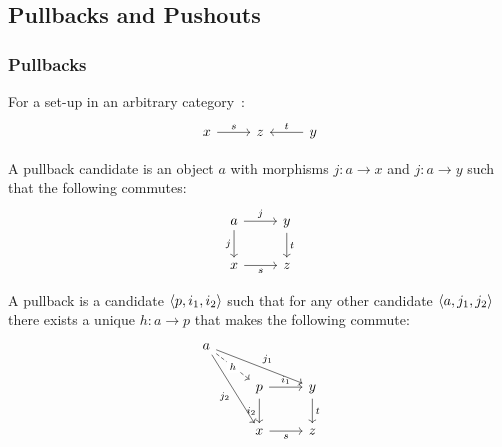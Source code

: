 \subsection{Pullbacks and Pushouts}

\subsubsection*{Pullbacks}

\begin{definition}
  For a set-up in an arbitrary
  category~\parencite{leinster:basic_category_theory}:
  \[\begin{tikzcd}[ampersand replacement=\&]
    x \& z \& y
    \arrow["t"', from=1-3, to=1-2]
    \arrow["s", from=1-1, to=1-2]
  \end{tikzcd}\]

  A pullback candidate is an object $a$ with morphisms $j:a\to x$ and
  $j:a\to y$ such that the following commutes:
  \[\begin{tikzcd}[ampersand replacement=\&]
    a \& y \\
    x \& z
    \arrow["t", from=1-2, to=2-2]
    \arrow["s"', from=2-1, to=2-2]
    \arrow["j"', from=1-1, to=2-1]
    \arrow["j", from=1-1, to=1-2]
  \end{tikzcd}\]

  A pullback is a candidate $\langle p, i_1, i_2\rangle$ such that for any other candidate
  $\langle a, j_1, j_2\rangle$ there exists a unique $h:a\to p$ that makes the following
  commute:
  \[\begin{tikzcd}[ampersand replacement=\&]
    a \\
    \& p \& y \\
    \& x \& z
    \arrow["{i_2}"', from=2-2, to=3-2]
    \arrow["{i_1}", from=2-2, to=2-3]
    \arrow["t", from=2-3, to=3-3]
    \arrow["s"', from=3-2, to=3-3]
    \arrow["{j_2}"', from=1-1, to=3-2]
    \arrow["{j_1}", from=1-1, to=2-3]
    \arrow["h"{description}, dashed, from=1-1, to=2-2]
  \end{tikzcd}\]
\end{definition}

